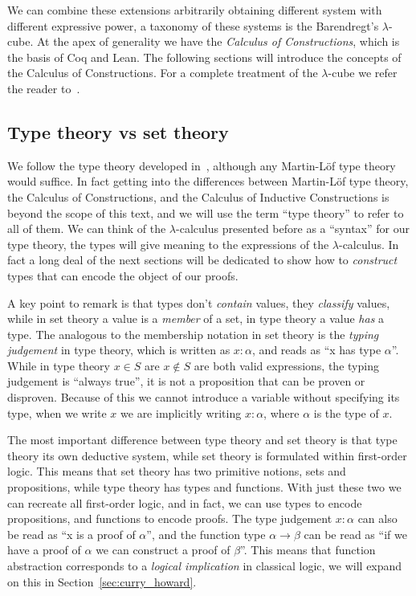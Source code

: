 \documentclass[
  a4paper, 
  10pt, 
  parskip=half, 
  DIV=20,
  toc=bibliography,
  usegeometry,
]{scrartcl}
\begin{document}
We can combine these extensions arbitrarily obtaining different system with 
different expressive power, a taxonomy of these systems is the Barendregt's 
\(\lambda\)-cube. At the apex of generality we have the \emph{Calculus of
Constructions}, which is the basis of Coq and Lean. The following sections will
introduce the concepts of the Calculus of Constructions. For a complete
treatment of the \(\lambda\)-cube we refer the reader to~\cite{lambda_with_types}.

\subsection{Type theory vs set theory}

We follow the type theory developed in~\cite{hottbook}, although any 
Martin-Löf type theory would suffice. In fact getting into the differences 
between Martin-Löf type theory, the Calculus of Constructions, and the
Calculus of Inductive Constructions is beyond the scope of this text, and we
will use the term \enquote{type theory} to refer to all of them.
We can think of the \(\lambda\)-calculus
presented before as a \enquote{syntax} for our type theory, the types will give
meaning to the expressions of the \(\lambda\)-calculus. In fact a long deal
of the next sections will be dedicated to show how to \emph{construct} types
that can encode the object of our proofs.

A key point to remark is that types don't \emph{contain} values, they \emph{classify}
values, while in set theory a value is a \emph{member} of a set, in type theory a
value \emph{has} a type. The analogous to the
membership notation in set theory is the \emph{typing judgement} in type theory,
which is written as \(x: \alpha\), and reads as \enquote{x has type \(\alpha\)}.
While in type theory \(x \in S\) are \(x \notin S\) are both valid expressions,
the typing judgement is \enquote{always true}, it is not a proposition that can be
proven or disproven.
Because of this we cannot introduce a variable without
specifying its type, when we write \(x\) we are implicitly writing \(x: \alpha\),
where \(\alpha\) is the type of \(x\).

The most important difference between type theory and set theory is that type
theory its own deductive system, while set theory is formulated within
first-order logic. This means that set theory has two primitive notions, sets
and propositions, while type theory has types and functions. With just these two
we can recreate all first-order logic, and in fact, we can use types to encode
propositions, and functions to encode proofs. The type judgement \(x: \alpha\)
can also be read as \enquote{x is a proof of \(\alpha\)}, and the function type
\(\alpha \to \beta\) can be read as \enquote{if we have a proof of \(\alpha\) we can
construct a proof of \(\beta\)}. This means that function abstraction corresponds
to a \emph{logical implication} in classical logic, we will expand on this 
in Section~\ref{sec:curry_howard}.
\end{document}

